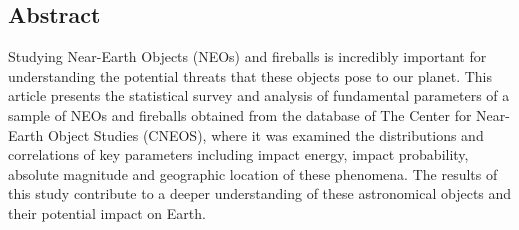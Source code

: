 \documentclass[a1,portrait]{a1poster}
\begin{document}
\begin{multicols}{2} %



\color{DarkOliveGreen} %




\section*{Abstract}

Studying Near-Earth Objects (NEOs) and fireballs is incredibly important for
understanding the potential threats that these objects pose to our planet. This article 
presents the statistical survey and analysis of fundamental parameters of a sample of NEOs
and fireballs obtained from the database of The Center for Near-Earth Object Studies (CNEOS),
where it was examined the distributions and correlations of key parameters including impact
energy, impact probability, absolute magnitude and geographic location of these phenomena.
The results of this study contribute to a deeper understanding of these astronomical objects
and their potential impact on Earth.


\end{multicols}
\end{document}
